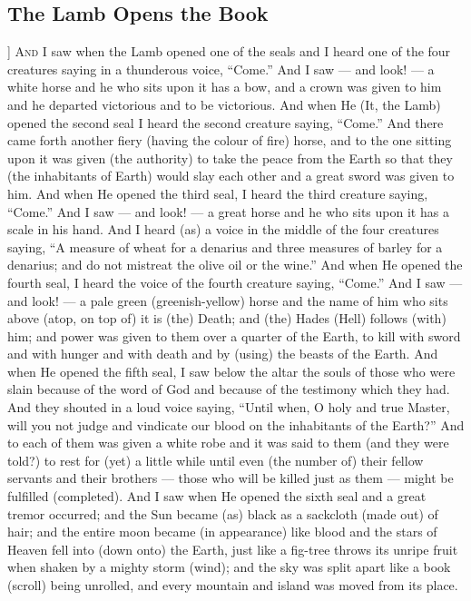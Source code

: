 \begin{pages}
\begin{Leftside}
        			\chapter{The Lamb Opens the Book}
				]
		\renewcommand{\LettrineFontHook}{\Zallmanfamily}
		\lettrine[lines=3]{A}{nd} I saw when the Lamb opened one of the seals and I heard one of the four creatures saying in a thunderous voice, “Come.” And I saw — and look! — a white horse and he who sits upon it has a bow, and a crown was given to him and he departed victorious and to be victorious.
		\pend
		\pstart
		And when He (It, the Lamb) opened the second seal I heard the second creature saying, “Come.” And there came forth another fiery (having the colour of fire) horse, and to the one sitting upon it was given (the authority) to take the peace from the Earth so that they (the inhabitants of Earth) would slay each other and a great sword was given to him.
		\pend
		\pstart
		And when He opened the third seal, I heard the third creature saying, “Come.” And I saw — and look! — a great horse and he who sits upon it has a scale in his hand. And I heard (as) a voice in the middle of the four creatures saying, “A measure of wheat for a denarius and three measures of barley for a denarius; and do not mistreat the olive oil or the wine.”
		\pend
		\pstart
		And when He opened the fourth seal, I heard the voice of the fourth creature saying, “Come.” And I saw — and look! — a pale green (greenish-yellow) horse and the name of him who sits above (atop, on top of) it is (the) Death; and (the) Hades (Hell) follows (with) him; and power was given to them over a quarter of the Earth, to kill with sword and with hunger and with death and by (using) the beasts of the Earth.
		\pend
		\pstart
		And when He opened the fifth seal, I saw below the altar the souls of those who were slain because of the word of God and because of the testimony which they had. And they shouted in a loud voice saying, “Until when, O holy and true Master, will you not judge and vindicate our blood on the inhabitants of the Earth?” And to each of them was given a white robe and it was said to them (and they were told?) to rest for (yet) a little while until even (the number of) their fellow servants and their brothers — those who will be killed just as them — might be fulfilled (completed).
		\pend
		\pstart
		And I saw when He opened the sixth seal and a great tremor occurred; and the Sun became (as) black as a sackcloth (made out) of hair; and the entire moon became (in appearance) like blood and the stars of Heaven fell into (down onto) the Earth, just like a fig-tree throws its unripe fruit when shaken by a mighty storm (wind); and the sky was split apart like a book (scroll) being unrolled, and every mountain and island was moved from its place.

\end{Leftside}
\end{pages}
